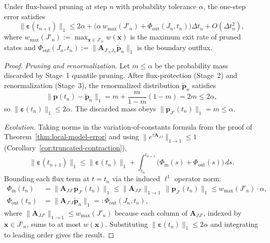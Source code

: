 \documentclass[onefignum,onetabnum]{siamart171218}
\begin{document}
\begin{corollary}
\label{cor:local-error-pruning}
Under flux-based pruning at step $n$ with probability tolerance $\alpha$, the one-step error satisfies
\begin{equation}
\|\boldsymbol{\varepsilon}(t_{n+1})\|_1 \leq 2\alpha + \bigl(\alpha\,w_{\max}(J'_n) + \Phi_{\mathrm{out}}(J_n,t_n)\bigr)\Delta t_n + O(\Delta t_n^2),
\end{equation}
where $w_{\max}(J'_n) := \max_{\boldsymbol{x}\in J'_n} w(\boldsymbol{x})$ is the maximum exit rate of pruned states and $\Phi_{\mathrm{out}}(J_n,t_n) := \|\mathbf{A}_{J'_nJ_n}\widetilde{\boldsymbol{p}}_n\|_1$ is the boundary outflux.
\end{corollary}
\begin{proof}
\emph{Pruning and renormalization.}  Let $m \leq \alpha$ be the probability mass discarded by Stage~1 quantile pruning.  After flux-protection (Stage~2) and renormalization (Stage~3), the renormalized distribution $\widetilde{\boldsymbol{p}}_n$ satisfies
\[
\|\boldsymbol{p}(t_n) - \widetilde{\boldsymbol{p}}_n\|_1 = m + \frac{m}{1-m}(1-m) = 2m \leq 2\alpha,
\]
so $\|\boldsymbol{\varepsilon}(t_n)\|_1 \leq 2\alpha$.  The discarded mass obeys $\|\boldsymbol{p}_{J'}(t_n)\|_1 = m \leq \alpha$.

\emph{Evolution.}  Taking norms in the variation-of-constants formula from the proof of Theorem~\ref{thm:local-model-error} and using $\|e^{\tau\mathbf{A}_{JJ}}\|_{1\to1}\leq 1$ (Corollary~\ref{cor:truncated-contraction}),
\[
\|\boldsymbol{\varepsilon}(t_{n+1})\|_1 \leq \|\boldsymbol{\varepsilon}(t_n)\|_1 + \int_{t_n}^{t_{n+1}}\bigl(\Phi_{\mathrm{in}}(s)+\Phi_{\mathrm{out}}(s)\bigr)\,ds.
\]
Bounding each flux term at $t=t_n$ via the induced $\ell^1$ operator norm:
\begin{align*}
\Phi_{\mathrm{in}}(t_n) &= \|\mathbf{A}_{JJ'}\boldsymbol{p}_{J'}(t_n)\|_1 \leq \|\mathbf{A}_{JJ'}\|_{1\to1}\,\|\boldsymbol{p}_{J'}(t_n)\|_1 \leq w_{\max}(J'_n)\cdot\alpha, \\
\Phi_{\mathrm{out}}(t_n) &= \|\mathbf{A}_{J'J}\widetilde{\boldsymbol{p}}_n\|_1 =: \Phi_{\mathrm{out}}(J_n,t_n),
\end{align*}
where $\|\mathbf{A}_{JJ'}\|_{1\to1}\leq w_{\max}(J'_n)$ because each column of $\mathbf{A}_{JJ'}$, indexed by $\boldsymbol{x}\in J'_n$, sums to at most $w(\boldsymbol{x})$.  Substituting $\|\boldsymbol{\varepsilon}(t_n)\|_1\leq 2\alpha$ and integrating to leading order gives the result.
\end{proof}
\end{document}
